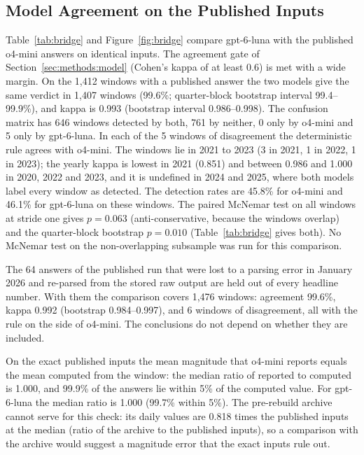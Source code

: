\subsection{Model Agreement on the Published Inputs}
\label{sec:results:bridge}

Table~\ref{tab:bridge} and Figure~\ref{fig:bridge} compare gpt-6-luna with the published o4-mini answers on identical inputs.
The agreement gate of Section~\ref{sec:methods:model} (Cohen's kappa of at least 0.6) is met with a wide margin. On the 1{,}412 windows with a published answer the two models give the same verdict in 1{,}407 windows (99.6\%; quarter-block bootstrap interval 99.4--99.9\%), and kappa is 0.993 (bootstrap interval 0.986--0.998). The confusion matrix has 646 windows detected by both, 761 by neither, 0 only by o4-mini and 5 only by gpt-6-luna. In each of the 5 windows of disagreement the deterministic rule agrees with o4-mini. The windows lie in 2021 to 2023 (3 in 2021, 1 in 2022, 1 in 2023); the yearly kappa is lowest in 2021 (0.851) and between 0.986 and 1.000 in 2020, 2022 and 2023, and it is undefined in 2024 and 2025, where both models label every window as detected. The detection rates are 45.8\% for o4-mini and 46.1\% for gpt-6-luna on these windows. The paired McNemar test on all windows at stride one gives $p=0.063$ (anti-conservative, because the windows overlap) and the quarter-block bootstrap $p=0.010$ (Table~\ref{tab:bridge} gives both). No McNemar test on the non-overlapping subsample was run for this comparison.

The 64 answers of the published run that were lost to a parsing error in January 2026 and re-parsed from the stored raw output are held out of every headline number. With them the comparison covers 1{,}476 windows: agreement 99.6\%, kappa 0.992 (bootstrap 0.984--0.997), and 6 windows of disagreement, all with the rule on the side of o4-mini. The conclusions do not depend on whether they are included.

On the exact published inputs the mean magnitude that o4-mini reports equals the mean computed from the window: the median ratio of reported to computed is 1.000, and 99.9\% of the answers lie within 5\% of the computed value. For gpt-6-luna the median ratio is 1.000 (99.7\% within 5\%). The pre-rebuild archive cannot serve for this check: its daily values are 0.818 times the published inputs at the median (ratio of the archive to the published inputs), so a comparison with the archive would suggest a magnitude error that the exact inputs rule out.

